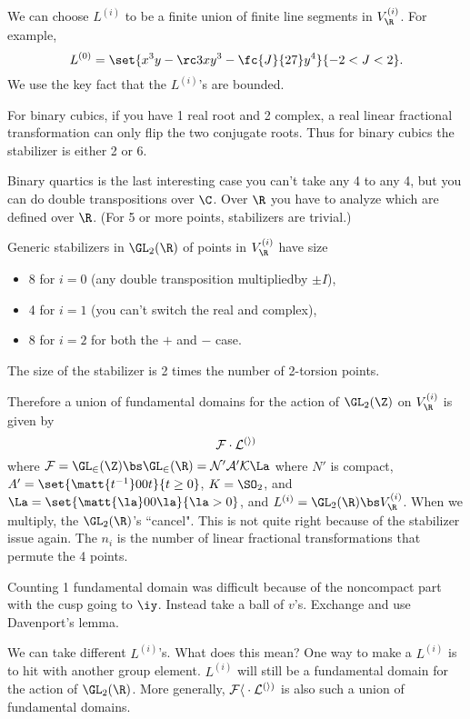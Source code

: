 We can choose $L^{(i)}$ to be a finite union of finite line segments in $V_\R^{(i)}$. For example, 
\[
L^{(0)} = \set{x^3y - \rc3xy^3 - \fc{J}{27}y^4}{-2<J<2}.
\]
We use the key fact that the $L^{(i)}$'s are bounded. 

For binary cubics, if you have 1 real root and 2 complex, a real linear fractional transformation can only flip the two conjugate roots. Thus for binary cubics the stabilizer is either 2 or 6.

Binary quartics is the last interesting case you can't take any 4 to any 4, but you can do double transpositions over $\C$. Over $\R$ you have to analyze which are defined over $\R$. (For 5 or more points, stabilizers are trivial.)

\begin{lem}
Generic stabilizers in $\GL_2(\R)$ of points in $V_{\R}^{(i)}$ have size 
\begin{itemize}
\item
8 for $i=0$ (any double transposition multipliedby $\pm I$), 
\item
4 for $i=1$ (you can't switch the real and complex),
\item
8 for $i=2$ for both the $+$ and $-$ case.
\end{itemize}
\end{lem}
The size of the stabilizer is 2 times the number of 2-torsion points.

Therefore a union of fundamental domains for the action of $\GL_2(\Z)$ on $V_{\R}^{(i)}$ is given by 
\[\cal F\cdot L^{(i)}\] where $\cal F=\GL_2(\Z)\bs \GL_2(\R) = N'A'K\La$ where $N'$ is compact, $A'=\set{\matt{t^{-1}}00{t}}{t\ge0}$, $K=\SO_2$, and $\La = \set{\matt{\la}00{\la}}{\la>0}$, and $L^{(i)}=\GL_2(\R)\bs V_{\R}^{(i)}$. 
When we multiply, the $\GL_2(\R)$'s ``cancel". This is not quite right because of the stabilizer issue again.
The $n_i$ is the number of linear fractional transformations that permute the 4 points.

Counting 1 fundamental domain was difficult because of the noncompact part with the cusp going to $\iy$. Instead take a ball of $v$'s. Exchange and use Davenport's lemma.

We can take different $L^{(i)}$'s. What does this mean? One way to make a $L^{(i)}$ is to hit with another group element. $L^{(i)}$ will still be a fundamental domain for the action of $\GL_2(\R)$. More generally, $\cal Fh\cdot L^{(i)}$ is also such a union of fundamental domains.


